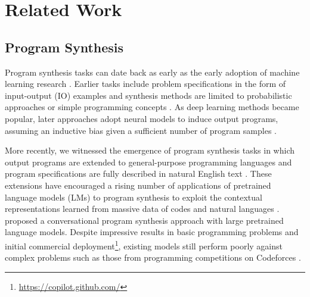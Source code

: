 \documentclass{article}
\begin{document}
 
\section{Related Work}
\subsection{Program Synthesis}
Program synthesis tasks can date back as early as the early adoption of machine learning research \citep{waldinger1969prow, manna1971toward}.
Earlier tasks include problem specifications in the form of input-output (IO) examples \citep{summers1977methodology, gulwani2012spreadsheet} and synthesis methods are limited to probabilistic approaches \citep{liang2010learning} or simple programming concepts \citep{joulin2015inferring, kurach2015neural}. 
As deep learning methods became popular, later approaches adopt neural models to induce output programs, assuming an inductive bias given a sufficient number of program samples \citep{parisotto2016neuro, balog2016deepcoder, devlin2017robustfill}. 


More recently, we witnessed the emergence of program synthesis tasks in which output programs are extended to general-purpose programming languages \citep{yin-neubig-2017-syntactic, xu2018sqlnet, chen2021evaluating} and program specifications are fully described in natural English text \citep{hendrycksapps2021, austin2021program, poesia2022synchromesh}.
These extensions have encouraged a rising number of applications of pretrained language models (LMs) to program synthesis to exploit the contextual representations learned from massive data of codes and natural languages \citep{feng-etal-2020-codebert, clement-etal-2020-pymt5, codet5, gpt-j, ChenVarCLR2022}.
\cite{nijkamp2022conversational} proposed a conversational program synthesis approach with large pretrained language models.
Despite impressive results in basic programming problems and initial commercial deployment\footnote{\url{https://copilot.github.com/}}, existing models still perform poorly against complex problems such as those from programming competitions on Codeforces \citep{hendrycksapps2021, li2022competition}. 
\end{document}

